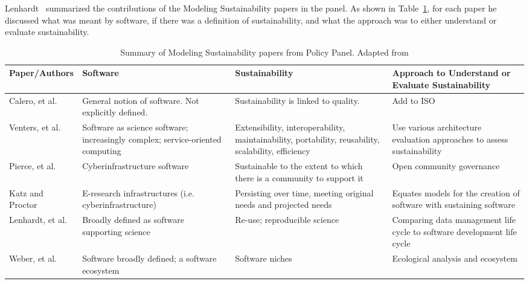 \documentclass[11pt, oneside]{amsart}
\begin{document}
Lenhardt~\cite{lenhardt-wssspe1-panel} summarized the contributions of the Modeling
Sustainability papers in the panel.
As shown in Table~\ref{tab:defining-sustainability}, for each paper he
discussed what was meant by software, if there was a definition of sustainability, and
what the approach was to either understand or evaluate sustainability.

\begin{table}[h]
  \begin{scriptsize}
    \begin{center}
      \caption{Summary of Modeling Sustainability papers from Policy Panel.  Adapted from \cite{lenhardt-wssspe1-panel}}
      \label{tab:defining-sustainability}
      \begin{tabular}{|p{2.3cm}|p{3.6cm}|p{4.4cm}|p{4.8cm}|}
		\hline
{\bf Paper/Authors}
& {\bf Software}
& {\bf Sustainability}
& {\bf Approach to Understand or Evaluate Sustainability} \\
		\hline
Calero, et al. \cite{Calero_WSSSPE}
& General notion of software. Not explicitly defined.
& Sustainability is linked to quality.
& Add to ISO \\
		\hline
Venters, et al. \cite{Venters_WSSSPE}
& Software as science software; increasingly complex; service-oriented computing
& Extensibility, interoperability, maintainability, portability, reusability, scalability, efficiency
& Use various architecture evaluation approaches to assess sustainability \\
		\hline
Pierce, et al. \cite{Pierce_WSSSPE}
& Cyberinfrastructure software
& Sustainable to the extent to which there is a community to support it
& Open community governance \\
		\hline
Katz and Proctor \cite{Katz_WSSSPE}
& E-research infrastructures (i.e. cyberinfrastructure)
& Persisting over time, meeting original needs and projected needs
& Equates models for the creation of software with sustaining software \\
		\hline
Lenhardt, et al. \cite{Lenhardt_WSSSPE}
& Broadly defined as software supporting science
& Re-use; reproducible science
& Comparing data management life cycle to software development life cycle \\
		\hline
Weber, et al. \cite{Weber_WSSSPE}
& Software broadly defined; a software ecosystem
& Software niches
& Ecological analysis and ecosystem \\
		\hline
     \end{tabular}
    \end{center}
  \end{scriptsize}
\end{table}
\end{document}
